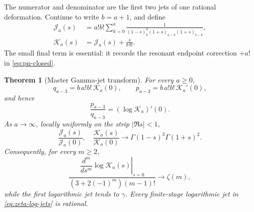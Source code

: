 \documentclass[11pt]{article}
\theoremstyle{keio}
\newtheorem{theorem}{Theorem}[section]
\theoremstyle{definition}
\theoremstyle{remark}
\begin{document}
The numerator and denominator are the first two jets of one rational
deformation.  Continue to write \(b=a+1\), and define
\begin{align}
 \mathscr J_a(s)&=a!b!\sum_{k=0}^a
 \frac1{(1-s)_k^3(1+s)_{a-k}(1+s)_{b-k}},
 \label{eq:Jas-def}\\
 \mathscr K_a(s)&=\mathscr J_a(s)+\frac{s}{b\,b!}.
 \label{eq:Kas-def}
\end{align}
The small final term is essential: it records the resonant endpoint
correction \(+a!\) in \eqref{eq:pn-closed}.

\begin{theorem}[Master Gamma-jet transform]
\label{thm:gamma-jet}
For every \(a\ge0\),
\begin{equation}\label{eq:zero-first-jets}
 \boxed{\displaystyle
 q_{a-3}=b\,a!b!\,\mathscr K_a(0),\qquad
 p_{a-3}=b\,a!b!\,\mathscr K_a'(0),}
\end{equation}
and hence
\begin{equation}\label{eq:gamma-first-log-jet}
 \frac{p_{a-3}}{q_{a-3}}=(\log\mathscr K_a)'(0).
\end{equation}
As \(a\to\infty\), locally uniformly on the strip \(|\Re s|<1\),
\begin{equation}\label{eq:Gamma-master-limit}
 \boxed{\displaystyle
 \frac{\mathscr J_a(s)}{\mathscr J_a(0)},\quad
 \frac{\mathscr K_a(s)}{\mathscr K_a(0)}
 \longrightarrow
 \Gamma(1-s)^3\Gamma(1+s)^2.}
\end{equation}
Consequently, for every \(m\ge2\),
\begin{equation}\label{eq:zeta-log-jets}
 \boxed{\displaystyle
 \frac{\left.\dfrac{d^m}{ds^m}\log\mathscr K_a(s)\right|_{s=0}}
 {(3+2(-1)^m)(m-1)!}\longrightarrow\zeta(m),}
\end{equation}
while the first logarithmic jet tends to \(\gamma\).
Every finite-stage logarithmic jet in \eqref{eq:zeta-log-jets} is rational.
\end{theorem}
\end{document}
